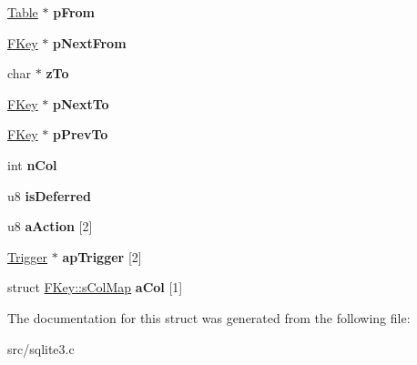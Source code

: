 \begin{DoxyCompactItemize}
\item 
\hypertarget{struct_f_key_a6d476f3fbfa75a19c5c5a9edec4e79eb}{\hyperlink{struct_table}{Table} $\ast$ {\bfseries p\-From}}\label{struct_f_key_a6d476f3fbfa75a19c5c5a9edec4e79eb}

\item 
\hypertarget{struct_f_key_ac64ff66b30167715c8822a74c2809075}{\hyperlink{struct_f_key}{F\-Key} $\ast$ {\bfseries p\-Next\-From}}\label{struct_f_key_ac64ff66b30167715c8822a74c2809075}

\item 
\hypertarget{struct_f_key_a1eac10bab38a0ac9f88306fbbabbe5d6}{char $\ast$ {\bfseries z\-To}}\label{struct_f_key_a1eac10bab38a0ac9f88306fbbabbe5d6}

\item 
\hypertarget{struct_f_key_ac29b26999113602e7e3921bf07643c04}{\hyperlink{struct_f_key}{F\-Key} $\ast$ {\bfseries p\-Next\-To}}\label{struct_f_key_ac29b26999113602e7e3921bf07643c04}

\item 
\hypertarget{struct_f_key_a56189e420e91df86513e6895db518eca}{\hyperlink{struct_f_key}{F\-Key} $\ast$ {\bfseries p\-Prev\-To}}\label{struct_f_key_a56189e420e91df86513e6895db518eca}

\item 
\hypertarget{struct_f_key_a611e3223f3f434e0a635e036dc100cbb}{int {\bfseries n\-Col}}\label{struct_f_key_a611e3223f3f434e0a635e036dc100cbb}

\item 
\hypertarget{struct_f_key_ab742714b17f2c13353837e1fdde51cc7}{u8 {\bfseries is\-Deferred}}\label{struct_f_key_ab742714b17f2c13353837e1fdde51cc7}

\item 
\hypertarget{struct_f_key_a68a08f58294bf845e9c77d785499d222}{u8 {\bfseries a\-Action} \mbox{[}2\mbox{]}}\label{struct_f_key_a68a08f58294bf845e9c77d785499d222}

\item 
\hypertarget{struct_f_key_a9ce15cb27b675836bc714ab18fd8a008}{\hyperlink{struct_trigger}{Trigger} $\ast$ {\bfseries ap\-Trigger} \mbox{[}2\mbox{]}}\label{struct_f_key_a9ce15cb27b675836bc714ab18fd8a008}

\item 
\hypertarget{struct_f_key_a5b230bc6c10a67f432ed7d5ebc92bcd2}{struct \hyperlink{struct_f_key_1_1s_col_map}{F\-Key\-::s\-Col\-Map} {\bfseries a\-Col} \mbox{[}1\mbox{]}}\label{struct_f_key_a5b230bc6c10a67f432ed7d5ebc92bcd2}

\end{DoxyCompactItemize}


The documentation for this struct was generated from the following file\-:\begin{DoxyCompactItemize}
\item 
src/sqlite3.\-c\end{DoxyCompactItemize}
